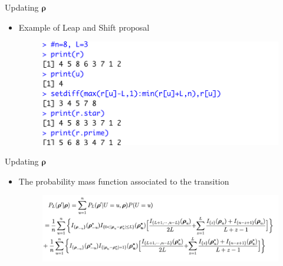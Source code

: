 \documentclass[11pt]{beamer}
\begin{document}
\begin{frame}{Updating $\boldsymbol{\rho}$}
\begin{itemize}
    \item Example of Leap and Shift proposal
    \begin{figure}
        \includegraphics{LeapAndShift.png}
    \end{figure}
\end{itemize}
\end{frame}

\begin{frame}{Updating $\boldsymbol{\rho}$}
\begin{itemize}
    \item The probability mass function associated to the transition
    \begin{figure}
        \includegraphics[width=11cm]{transitionProb.png}
    \end{figure}
\end{itemize}
\end{frame}
\end{document}
